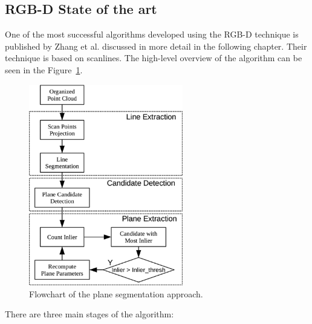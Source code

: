 \subsection{RGB-D State of the art}

One of the most successful algorithms developed using the RGB-D technique
is published by Zhang \cite{articleFPSLinePrimitivesRGBD} et al. discussed in more detail in the following chapter.
Their technique is based on scanlines.
The high-level overview of the algorithm can be seen in the Figure~\ref{figure:Flowchart-Zhang}.

\begin{figure}[H]
    \centering
    \includegraphics[width=0.6\textwidth]{images/psd/RGBD/Flowchart-Zhang.png}
    \caption{Flowchart of the plane segmentation approach. \cite{articleFPSLinePrimitivesRGBD}}
    \label{figure:Flowchart-Zhang}
\end{figure}

There are three main stages of the algorithm:


